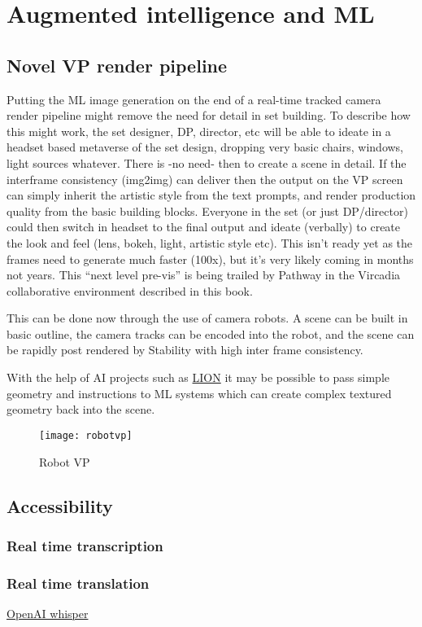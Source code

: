 \section{Augmented intelligence and ML}
\subsection{Novel VP render pipeline}
Putting the ML image generation on the end of a real-time tracked camera render pipeline might remove the need for detail in set building. To describe how this might work, the set designer, DP, director, etc will be able to ideate in a headset based metaverse of the set design, dropping very basic chairs, windows, light sources whatever. There is -no need- then to create a scene in detail. If the interframe consistency (img2img) can deliver then the output on the VP screen can simply inherit the artistic style from the text prompts, and render production quality from the basic building blocks. Everyone in the set (or just DP/director) could then switch in headset to the final output and ideate (verbally) to create the look and feel (lens, bokeh, light, artistic style etc). This isn’t ready yet as the frames need to generate much faster (100x), but it’s very likely coming in months not years. This ``next level pre-vis'' is being trailed by Pathway in the Vircadia collaborative environment described in this book.\par
This can be done now through the use of camera robots. A scene can be built in basic outline, the camera tracks can be encoded into the robot, and the scene can be rapidly post rendered by Stability with high inter frame consistency.\par
With the help of AI projects such as \href{https://nv-tlabs.github.io/LION/}{LION} it may be possible to pass simple geometry and instructions to ML systems which can create complex textured geometry back into the scene.
\begin{figure}[ht]\centering 	\texttt{[image: robotvp]}
	\caption{Robot VP}
	\label{fig:robotvp}
\end{figure}
\subsection{Accessibility}
\subsubsection{Real time transcription}
\subsubsection{Real time translation}
\href{https://openai.com/blog/whisper/}{OpenAI whisper}
